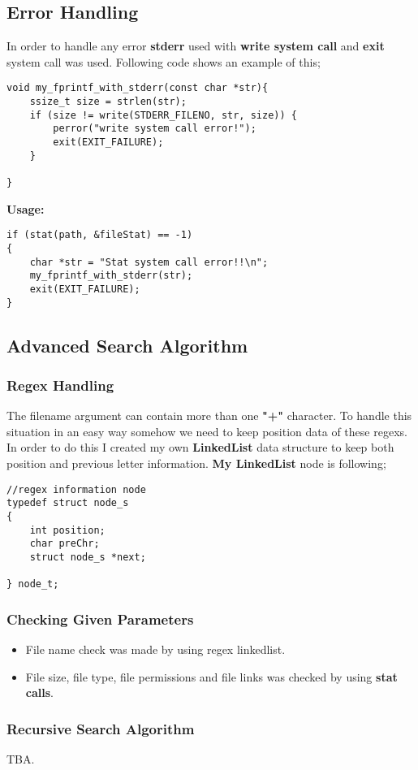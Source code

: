\documentclass{article}
\begin{document}
\subsection{Error Handling}
In order to handle any error \textbf{stderr} used with \textbf{write system call} and 
\textbf{exit} system call was used.
Following code shows an example of this;
\begin{lstlisting}[style=CStyle]
void my_fprintf_with_stderr(const char *str){
    ssize_t size = strlen(str);
    if (size != write(STDERR_FILENO, str, size)) {
        perror("write system call error!");
        exit(EXIT_FAILURE);
    }

}
\end{lstlisting}
\textbf{Usage:}
\begin{lstlisting}[style=CStyle]
if (stat(path, &fileStat) == -1)
{
    char *str = "Stat system call error!!\n";
    my_fprintf_with_stderr(str);
    exit(EXIT_FAILURE);
}   
\end{lstlisting}
\subsection{Advanced Search Algorithm}
\subsubsection{Regex Handling}
The filename argument can contain more than one \textbf{"+"} character. To handle this situation in an easy way somehow we need to keep position data of these regexs. In order to do this I created my own \textbf{LinkedList} data structure to keep both position and previous letter information. \textbf{My LinkedList} node is following;
\begin{lstlisting}[style=CStyle]
//regex information node
typedef struct node_s
{
    int position;
    char preChr;
    struct node_s *next;

} node_t;
\end{lstlisting}
\subsubsection{Checking Given Parameters}
\begin{itemize}
	\item File name check was made by using regex linkedlist.
	\item File size, file type, file permissions and file links was checked by using \textbf{stat calls}. 
\end{itemize}
\subsubsection{Recursive Search Algorithm}
TBA.
\end{document}
